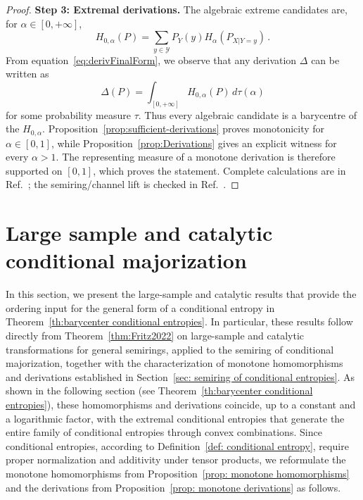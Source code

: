 \documentclass[aps,pra,11pt,onecolumn,nofootinbib,tightenlines]{revtex4-2}
\theoremstyle{definition}
\newcommand{\mc}[1]{\mathcal{#1}}
\begin{document}
\begin{proof}
\medskip
\noindent \noindent\textbf{Step 3: Extremal derivations.}
The algebraic extreme candidates are, for $\alpha\in[0,+\infty]$,
\begin{equation}\label{eq:ExtDerivation proof}
H_{0,\alpha}(P)=\sum_{y\in\mc Y} P_Y(y)H_\alpha(P_{X|Y=y})\,.
\end{equation}
From equation~\eqref{eq:derivFinalForm}, we observe that any derivation \(\Delta\) can be written as
\begin{equation}
    \Delta(P) = \int_{[0,+\infty]} H_{0,\alpha}(P)\, d\tau(\alpha)
\end{equation}
for some probability measure \(\tau\). Thus every algebraic candidate is a
barycentre of the $H_{0,\alpha}$. Proposition~\ref{prop:sufficient-derivations}
proves monotonicity for $\alpha\in[0,1]$, while
Proposition~\ref{prop:Derivations} gives an explicit witness for
every $\alpha>1$. The representing measure of a monotone derivation is
therefore supported on $[0,1]$, which proves the statement. Complete
calculations are in Ref.~\cite{rubboli2026parametersFull}; the semiring/channel
lift is checked in Ref.~\cite{rubboli2026parametersLean}.
\end{proof}


\def\IntegratedParameterSections{1}




\section{Large sample and catalytic conditional majorization}
\label{sec: large sample}
In this section, we present the large-sample and catalytic results that provide
the ordering input for the general form of a conditional entropy in
Theorem~\ref{th:barycenter conditional entropies}.
In particular, these results follow directly from Theorem~\ref{thm:Fritz2022} on large-sample and catalytic transformations for general semirings, applied to the semiring of conditional majorization, together with the characterization of monotone homomorphisms and derivations established in Section~\ref{sec: semiring of conditional entropies}.
As shown in the following section (see Theorem~\ref{th:barycenter conditional entropies}), these homomorphisms and derivations coincide, up to a constant and a logarithmic factor, with the extremal conditional entropies that generate the entire family of conditional entropies through convex combinations.
Since conditional entropies, according to Definition~\ref{def: conditional entropy}, require proper normalization and additivity under tensor products, we reformulate the monotone homomorphisms from Proposition~\ref{prop: monotone homomorphisms} and the derivations from Proposition~\ref{prop: monotone derivations} as follows.
\end{document}
